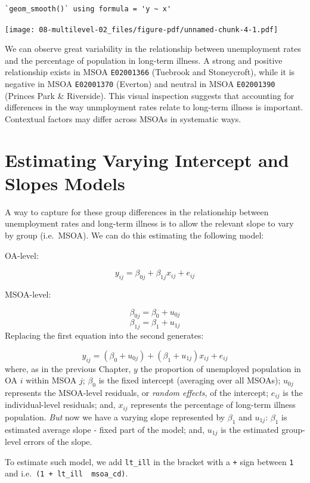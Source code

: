 \documentclass[
  letterpaper,
  DIV=11,
  numbers=noendperiod,
  oneside]{scrreprt}
\begin{document}
\begin{verbatim}
`geom_smooth()` using formula = 'y ~ x'
\end{verbatim}

\texttt{[image: 08-multilevel-02\_files/figure-pdf/unnamed-chunk-4-1.pdf]}

We can observe great variability in the relationship between
unemployment rates and the percentage of population in long-term
illness. A strong and positive relationship exists in MSOA
\texttt{E02001366} (Tuebrook and Stoneycroft), while it is negative in
MSOA \texttt{E02001370} (Everton) and neutral in MSOA \texttt{E02001390}
(Princes Park \& Riverside). This visual inspection suggests that
accounting for differences in the way unmployment rates relate to
long-term illness is important. Contextual factors may differ across
MSOAs in systematic ways.

\section{Estimating Varying Intercept and Slopes
Models}\label{estimating-varying-intercept-and-slopes-models}

A way to capture for these group differences in the relationship between
unemployment rates and long-term illness is to allow the relevant slope
to vary by group (i.e.~MSOA). We can do this estimating the following
model:

OA-level:

\[y_{ij} = \beta_{0j} + \beta_{1j}x_{ij} + e_{ij}\]

MSOA-level:

\[\beta_{0j} = \beta_{0} + u_{0j}\] \[\beta_{1j} = \beta_{1} + u_{1j} \]
Replacing the first equation into the second generates:

\[y_{ij} = (\beta_{0} + u_{0j}) + (\beta_{1} + u_{1j})x_{ij} + e_{ij}\]
where, as in the previous Chapter, \(y\) the proportion of unemployed
population in OA \(i\) within MSOA \(j\); \(\beta_{0}\) is the fixed
intercept (averaging over all MSOAs); \(u_{0j}\) represents the
MSOA-level residuals, or \emph{random effects}, of the intercept;
\(e_{ij}\) is the individual-level residuals; and, \(x_{ij}\) represents
the percentage of long-term illness population. \emph{But} now we have a
varying slope represented by \(\beta_{1}\) and \(u_{1j}\): \(\beta_{1}\)
is estimated average slope - fixed part of the model; and, \(u_{1j}\) is
the estimated group-level errors of the slope.

To estimate such model, we add \texttt{lt\_ill} in the bracket with a
\texttt{+} sign between \texttt{1} and \texttt{\textbar{}}
i.e.~\texttt{(1\ +\ lt\_ill\ \textbar{}\ msoa\_cd)}.
\end{document}
